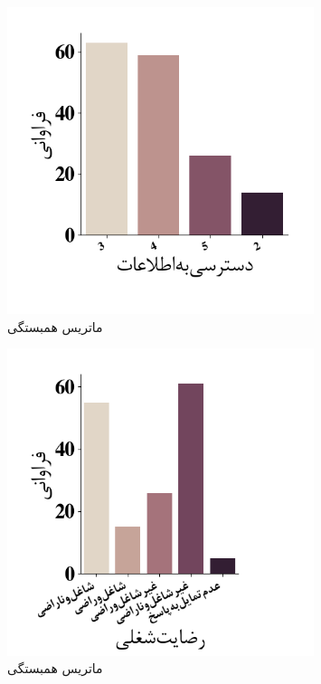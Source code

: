 \begin{figure}[htpb]
    \centering
    \includegraphics[width=0.8\textwidth]{./img/ordinal/InformationQuestion.png}
    \caption{ماتریس همبستگی}
    \label{fig:CorrPlotIntervals}
\end{figure}
\begin{figure}[htpb]
    \centering
    \includegraphics[width=0.8\textwidth]{./img/ordinal/JobSatisfaction.png}
    \caption{ماتریس همبستگی}
    \label{fig:CorrPlotIntervals}
\end{figure}
